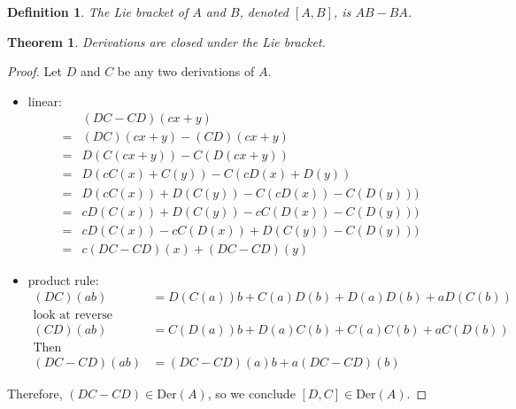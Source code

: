 \documentclass[11pt,leqno,oneside]{amsart}
\newcommand{\Der}{\text{Der}}
\theoremstyle{mystyle} \newtheorem{thrm}[thm]{Theorem}
\theoremstyle{mystyle} \newtheorem{defi}[thm]{Definition}
\begin{document}
\begin{defi}
	The \emph{Lie bracket} of $A$ and $B$, denoted $[A,B]$, is $AB - BA$.
\end{defi}
\begin{thrm}
	Derivations are closed under the Lie bracket.
\end{thrm}
\begin{proof}
	Let $D$ and $C$ be any two derivations of $A$.
	\begin{itemize}
		\item linear:
		\begin{align}
			& (DC - CD)(cx + y) \\
			=& (DC)(cx + y) - (CD)(cx + y) \\
			=& D(C(cx + y)) - C(D(cx + y)) \\
			=& D(cC(x) + C(y)) - C(cD(x) + D(y)) \\
			=& D(cC(x)) + D(C(y)) - C(cD(x)) - C(D(y))) \\
			=& cD(C(x)) + D(C(y)) - cC(D(x)) - C(D(y))) \\
			=& cD(C(x)) - cC(D(x))+  D(C(y)) - C(D(y))) \\
			=& c(DC-CD)(x)      +    (DC-CD)(y)
		\end{align}
		\item product rule:
		\begin{align}
			(DC)(ab) &= D(C(a))b + C(a)D(b) + D(a)D(b) + aD(C(b)) \\
			\text{look at reverse} \\
			(CD)(ab) &= C(D(a))b + D(a)C(b) + C(a)C(b) + aC(D(b)) \\
			\text{Then} \\
			(DC - CD)(ab) &= (DC - CD)(a)b + a(DC - CD)(b)
		\end{align}
	\end{itemize}
	Therefore,  $(DC - CD) \in \Der(A)$, so we conclude $[D,C] \in \Der(A)$.
\end{proof}
\end{document}
